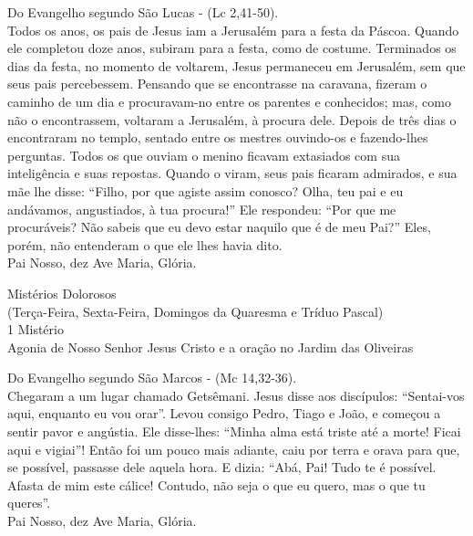 \documentclass{book}
\begin{document}
\begin{flushleft}
    Do Evangelho segundo São Lucas - (\textcolor{VioletRed2}{Lc 2,41-50}). \\
    \hfill{} \break{}
    Todos os anos, os pais de Jesus iam a Jerusalém para a festa da Páscoa. Quando ele completou doze anos, subiram para a festa, como de costume. Terminados os dias da festa, no momento de voltarem, Jesus permaneceu em Jerusalém, sem que seus pais percebessem. Pensando que se encontrasse na caravana, fizeram o caminho de um dia e procuravam-no entre os parentes e conhecidos; mas, como não o encontrassem, voltaram a Jerusalém, à procura dele. Depois de três dias o encontraram no templo, sentado entre os mestres ouvindo-os e fazendo-lhes perguntas. Todos os que ouviam o menino ficavam extasiados com sua inteligência e suas repostas. Quando o viram, seus pais ficaram admirados, e sua mãe lhe disse: ``Filho, por que agiste assim conosco? Olha, teu pai e eu andávamos, angustiados, à tua procura!'' Ele respondeu: ``Por que me procuráveis? Não sabeis que eu devo estar naquilo que é de meu Pai?'' Eles, porém, não entenderam o que ele lhes havia dito. \\
    \hfill{} \break{}
    Pai Nosso, dez Ave Maria, Glória.
\end{flushleft}
\newpage
\begin{center}
    Mistérios Dolorosos \\ \textcolor{VioletRed2}{\scriptsize{(Terça-Feira, Sexta-Feira, Domingos da Quaresma e Tríduo Pascal)}} \\
    \hfill{} \break{}
    1\textordmasculine{} Mistério \\ Agonia de Nosso Senhor Jesus Cristo e a oração no Jardim das Oliveiras
\end{center}
\begin{flushleft}
    Do Evangelho segundo São Marcos - (\textcolor{VioletRed2}{Mc 14,32-36}). \\
    \hfill{} \break{}
    Chegaram a um lugar chamado Getsêmani. Jesus disse aos discípulos: ``Sentai-vos aqui, enquanto eu vou orar''. Levou consigo Pedro, Tiago e João, e começou a sentir pavor e angústia. Ele disse-lhes: ``Minha alma está triste até a morte! Ficai aqui e vigiai''! Então foi um pouco mais adiante, caiu por terra e orava para que, se possível, passasse dele aquela hora. E dizia: ``Abá, Pai! Tudo te é possível. Afasta de mim este cálice! Contudo, não seja o que eu quero, mas o que tu queres''. \\
    \hfill{} \break{}
    Pai Nosso, dez Ave Maria, Glória.
\end{flushleft}
\end{document}
